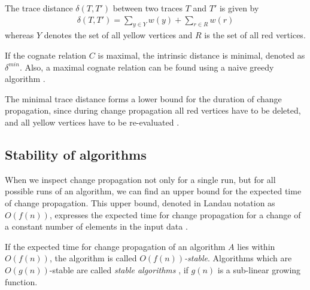 \begin{definition}
The trace distance $\delta(T, T')$ between two traces $T$ and $T'$ is given by
\begin{align*}
	\delta(T, T') = \sum_{y \in Y} w(y) + \sum_{r \in R} w(r)
\end{align*}
whereas $Y$ denotes the set of all yellow vertices and $R$ is the set of all red vertices. 
\end{definition}

If the cognate relation $C$ is maximal, the intrinsic distance is minimal, denoted as $\delta^{min}$. Also, a maximal cognate relation can be found using a naive greedy algorithm \cite{Acar2005thesis} \cite{acar2004dynamizing}.

The minimal trace distance forms a lower bound for the duration of change propagation, since during change propagation all red vertices have to be deleted, and all yellow vertices have to be re-evaluated \cite{Acar2005thesis}. 

\subsection{Stability of algorithms}

When we inspect change propagation not only for a single run, but for all possible runs of an algorithm, we can find an upper bound for the expected time of change propagation. This upper bound, denoted in Landau notation as $O(f(n))$, expresses the expected time for change propagation for a change of a constant number of elements in the input data \cite{Acar2005thesis}. 

If the expected time for change propagation of an algorithm $A$ lies within $O(f(n))$, the algorithm is called $O(f(n))$\textit{-stable}. 
Algorithms which are $O(g(n))$-stable are called \textit{stable algorithms} \cite{Acar2005thesis}, if $g(n)$ is a sub-linear growing function.